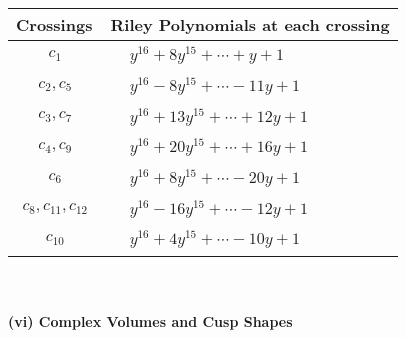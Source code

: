 \documentclass[1p]{elsarticle_modified}
\theoremstyle{definition}
\begin{document}
\begin{tabular}{m{50pt}|m{274pt}}
Crossings & \hspace{64pt}Riley Polynomials at each crossing \\
\hline $$\begin{aligned}c_{1}\end{aligned}$$&$\begin{aligned}
&y^{16}+8 y^{15}+\cdots+y+1
\end{aligned}$\\
\hline $$\begin{aligned}c_{2},c_{5}\end{aligned}$$&$\begin{aligned}
&y^{16}-8 y^{15}+\cdots-11 y+1
\end{aligned}$\\
\hline $$\begin{aligned}c_{3},c_{7}\end{aligned}$$&$\begin{aligned}
&y^{16}+13 y^{15}+\cdots+12 y+1
\end{aligned}$\\
\hline $$\begin{aligned}c_{4},c_{9}\end{aligned}$$&$\begin{aligned}
&y^{16}+20 y^{15}+\cdots+16 y+1
\end{aligned}$\\
\hline $$\begin{aligned}c_{6}\end{aligned}$$&$\begin{aligned}
&y^{16}+8 y^{15}+\cdots-20 y+1
\end{aligned}$\\
\hline $$\begin{aligned}c_{8},c_{11},c_{12}\end{aligned}$$&$\begin{aligned}
&y^{16}-16 y^{15}+\cdots-12 y+1
\end{aligned}$\\
\hline $$\begin{aligned}c_{10}\end{aligned}$$&$\begin{aligned}
&y^{16}+4 y^{15}+\cdots-10 y+1
\end{aligned}$\\
\hline
\end{tabular}\\~\\
\newpage\flushleft \textbf{(vi) Complex Volumes and Cusp Shapes}
\end{document}
